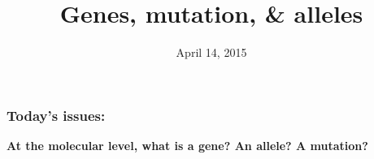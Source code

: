 





\title[Genes, mutation, \& alleles]{Genes, mutation, \& alleles}
\date{April 14, 2015}



\begin{noheadline}
\maketitle
\end{noheadline}


\begin{noheadline}
\begin{frame}
\frametitle{Today's issues:}
\textbf{At the molecular level, what is a gene? An allele? A mutation?} \\
\vspace{5mm}
\tableofcontents[subsectionstyle=hide]
\end{frame}
\end{noheadline}

